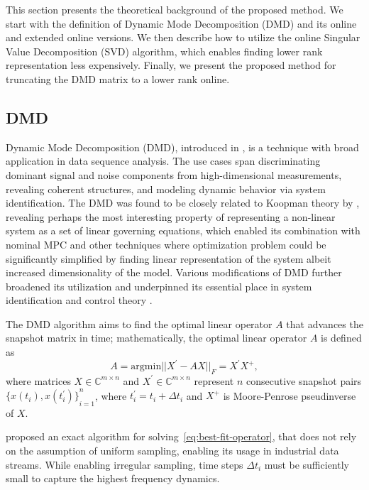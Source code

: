 This section presents the theoretical background of the proposed method. We start with the definition of Dynamic Mode Decomposition (DMD) and its online and extended online versions. We then describe how to utilize the online Singular Value Decomposition (SVD) algorithm, which enables finding lower rank representation less expensively. Finally, we present the proposed method for truncating the DMD matrix to a lower rank online.

\subsection{DMD}\label{sec:dmd}
Dynamic Mode Decomposition (DMD), introduced in \citet{Schmid2010}, is a technique with broad application in data sequence analysis. The use cases span discriminating dominant signal and noise components from high-dimensional measurements, revealing coherent structures, and modeling dynamic behavior via system identification. The DMD was found to be closely related to Koopman theory by \citet{Rowley2009}, revealing perhaps the most interesting property of representing a non-linear system as a set of linear governing equations, which enabled its combination with nominal MPC and other techniques where optimization problem could be significantly simplified by finding linear representation of the system albeit increased dimensionality of the model. Various modifications of DMD further broadened its utilization and underpinned its essential place in system identification and control theory \citep{Schmid2022}.

The DMD algorithm aims to find the optimal linear operator \(A\) that advances the snapshot matrix in time; mathematically, the optimal linear operator \(A\) is defined as
\begin{equation}\label{eq:best-fit-operator}
    A = \mathrm{argmin} ||X^\prime - AX||_F = X^\prime X^+,
\end{equation}
where matrices \(X \in \mathbb{C}^{m \times n}\) and \(X^\prime \in \mathbb{C}^{m \times n}\) represent \(n\) consecutive snapshot pairs \({\{x(t_i), x(t_i^\prime )\}}^n_{i=1}\), where \(t_i^\prime = t_i + \Delta t_i\) and \(X^+\) is Moore-Penrose pseudinverse of \(X\).

\citet{Tu2013} proposed an exact algorithm for solving~\eqref{eq:best-fit-operator}, that does not rely on the assumption of uniform sampling, enabling its usage in industrial data streams. While enabling irregular sampling, time steps \(\Delta t_i\) must be sufficiently small to capture the highest frequency dynamics.

